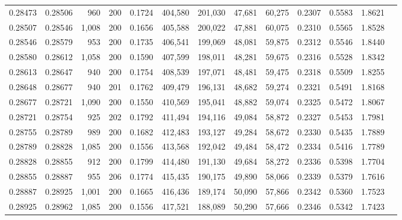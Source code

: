 \begin{tabular}{rrrrrrrrrrrrr}
0.28473 & 0.28506 &   960 & 200 &                                     0.1724 & 404,580 & 201,030 &  47,681 &  60,275 & 0.2307 & 0.5583 & 1.8621 \\
0.28507 & 0.28546 & 1,008 & 200 &                                     0.1656 & 405,588 & 200,022 &  47,881 &  60,075 & 0.2310 & 0.5565 & 1.8528 \\
0.28546 & 0.28579 &   953 & 200 &                                     0.1735 & 406,541 & 199,069 &  48,081 &  59,875 & 0.2312 & 0.5546 & 1.8440 \\
0.28580 & 0.28612 & 1,058 & 200 &                                     0.1590 & 407,599 & 198,011 &  48,281 &  59,675 & 0.2316 & 0.5528 & 1.8342 \\
0.28613 & 0.28647 &   940 & 200 &                                     0.1754 & 408,539 & 197,071 &  48,481 &  59,475 & 0.2318 & 0.5509 & 1.8255 \\
0.28648 & 0.28677 &   940 & 201 &                                     0.1762 & 409,479 & 196,131 &  48,682 &  59,274 & 0.2321 & 0.5491 & 1.8168 \\
0.28677 & 0.28721 & 1,090 & 200 &                                     0.1550 & 410,569 & 195,041 &  48,882 &  59,074 & 0.2325 & 0.5472 & 1.8067 \\
0.28721 & 0.28754 &   925 & 202 &                                     0.1792 & 411,494 & 194,116 &  49,084 &  58,872 & 0.2327 & 0.5453 & 1.7981 \\
0.28755 & 0.28789 &   989 & 200 &                                     0.1682 & 412,483 & 193,127 &  49,284 &  58,672 & 0.2330 & 0.5435 & 1.7889 \\
0.28789 & 0.28828 & 1,085 & 200 &                                     0.1556 & 413,568 & 192,042 &  49,484 &  58,472 & 0.2334 & 0.5416 & 1.7789 \\
0.28828 & 0.28855 &   912 & 200 &                                     0.1799 & 414,480 & 191,130 &  49,684 &  58,272 & 0.2336 & 0.5398 & 1.7704 \\
0.28855 & 0.28887 &   955 & 206 &                                     0.1774 & 415,435 & 190,175 &  49,890 &  58,066 & 0.2339 & 0.5379 & 1.7616 \\
0.28887 & 0.28925 & 1,001 & 200 &                                     0.1665 & 416,436 & 189,174 &  50,090 &  57,866 & 0.2342 & 0.5360 & 1.7523 \\
0.28925 & 0.28962 & 1,085 & 200 &                                     0.1556 & 417,521 & 188,089 &  50,290 &  57,666 & 0.2346 & 0.5342 & 1.7423 \\

\end{tabular}

